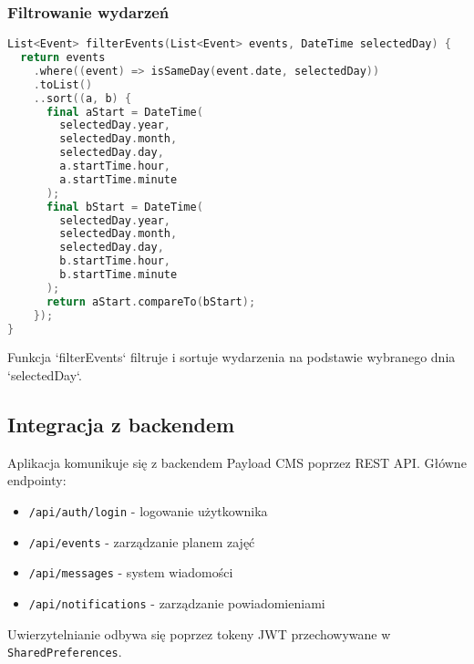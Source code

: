 \subsubsection{Filtrowanie wydarzeń}
\begin{lstlisting}[language=C++, caption=Filtrowanie wydarzeń, label={lst:event-filtering}]
List<Event> filterEvents(List<Event> events, DateTime selectedDay) {
  return events
    .where((event) => isSameDay(event.date, selectedDay))
    .toList()
    ..sort((a, b) {
      final aStart = DateTime(
        selectedDay.year, 
        selectedDay.month, 
        selectedDay.day,
        a.startTime.hour,
        a.startTime.minute
      );
      final bStart = DateTime(
        selectedDay.year,
        selectedDay.month,
        selectedDay.day,
        b.startTime.hour,
        b.startTime.minute
      );
      return aStart.compareTo(bStart);
    });
}
\end{lstlisting}
Funkcja `filterEvents` filtruje i sortuje wydarzenia na podstawie wybranego dnia `selectedDay`.

\subsection{Integracja z backendem}

Aplikacja komunikuje się z backendem Payload CMS poprzez REST API. Główne endpointy:

\begin{itemize}
  \item \texttt{/api/auth/login} - logowanie użytkownika
  \item \texttt{/api/events} - zarządzanie planem zajęć
  \item \texttt{/api/messages} - system wiadomości
  \item \texttt{/api/notifications} - zarządzanie powiadomieniami
\end{itemize}
Uwierzytelnianie odbywa się poprzez tokeny JWT przechowywane w \texttt{SharedPreferences}.